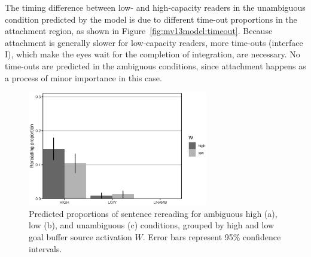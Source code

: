 \documentclass{cambridge7A}\usepackage[]{graphicx}\usepackage[]{color}
\newenvironment{knitrout}{}{} %
\begin{document}
The timing difference between low- and high-capacity readers in the unambiguous condition predicted by the model is due to different time-out proportions in the attachment region, as shown in Figure~\ref{fig:mv13model:timeout}. Because attachment is generally slower for low-capacity readers, more time-outs (interface I), which make the eyes wait for the completion of integration, are necessary. No time-outs are predicted in the ambiguous conditions, since attachment happens as a process of minor importance in this case.

\begin{figure}[!htbp]
  \centering
%
\begin{knitrout}
\color{fgcolor}

{\centering \includegraphics[width=0.7\textwidth]{figures/fig-mv13modelrer-1} 

}



\end{knitrout}
%
  \caption[Predicted proportions of sentence rereading by source activation at ambiguous and unambiguous attachments.]{Predicted proportions of sentence rereading for ambiguous high (a), low (b), and unambiguous (c) conditions, grouped by high and low goal buffer source activation $W$. Error bars represent 95\% confidence intervals.}
  \label{fig:mv13model:rer}
\end{figure}
\end{document}
